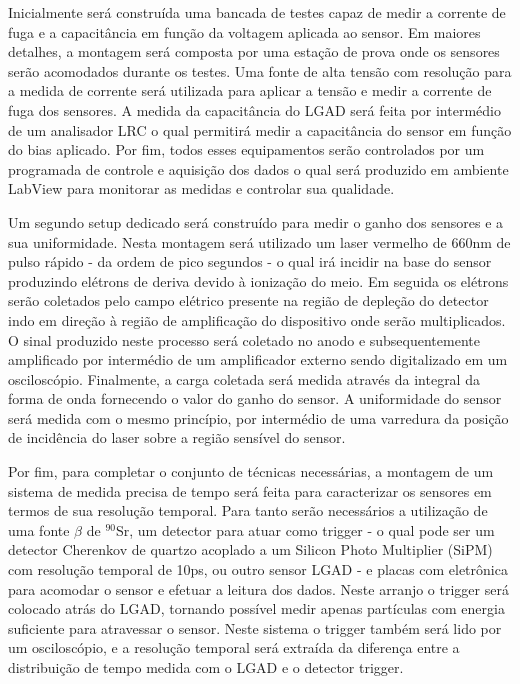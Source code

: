 
Inicialmente será construída uma bancada de testes capaz de medir a corrente de fuga e a capacitância em função da voltagem aplicada ao sensor. Em maiores detalhes, a montagem será composta por uma estação de prova onde os sensores serão acomodados durante os testes. Uma fonte de alta tensão com resolução para a medida de corrente será utilizada para aplicar a tensão e medir a corrente de fuga dos sensores. A medida da capacitância do LGAD será feita por intermédio de um analisador LRC o qual permitirá medir a capacitância do sensor em função do bias aplicado. Por fim, todos esses equipamentos serão controlados por um programada de controle e aquisição dos dados o qual será produzido em ambiente LabView para monitorar as medidas e controlar sua qualidade.

Um segundo setup dedicado será construído para medir o ganho dos sensores e a sua uniformidade. Nesta montagem será utilizado um laser vermelho de 660nm de pulso rápido - da ordem de pico segundos - o qual irá incidir na base do sensor produzindo elétrons de deriva devido à ionização do meio. Em seguida os elétrons serão coletados pelo campo elétrico presente na região de depleção do detector indo em direção à região de amplificação do dispositivo onde serão multiplicados. O sinal produzido neste processo será coletado no anodo e subsequentemente amplificado por intermédio de um amplificador externo sendo digitalizado em um osciloscópio. Finalmente, a carga coletada será medida através da integral da forma de onda fornecendo o valor do ganho do sensor. A uniformidade do sensor será medida com o mesmo princípio, por intermédio de uma varredura da posição de incidência do laser sobre a região sensível do sensor.

Por fim, para completar o conjunto de técnicas necessárias, a montagem de um sistema de medida precisa de tempo será feita para caracterizar os sensores em termos de sua resolução temporal. Para tanto serão necessários a utilização de uma fonte $\beta$ de $^{90}$Sr, um detector para atuar como trigger - o qual pode ser um detector Cherenkov de quartzo acoplado a um Silicon Photo Multiplier (SiPM) com resolução temporal de 10ps, ou outro sensor LGAD - e placas com eletrônica para acomodar o sensor e efetuar a leitura dos dados. Neste arranjo o trigger será colocado atrás do LGAD, tornando possível medir apenas partículas com energia suficiente para atravessar o sensor. Neste sistema o trigger também será lido por um osciloscópio, e a resolução temporal será extraída da diferença entre a distribuição de tempo medida com o LGAD e o detector trigger.

